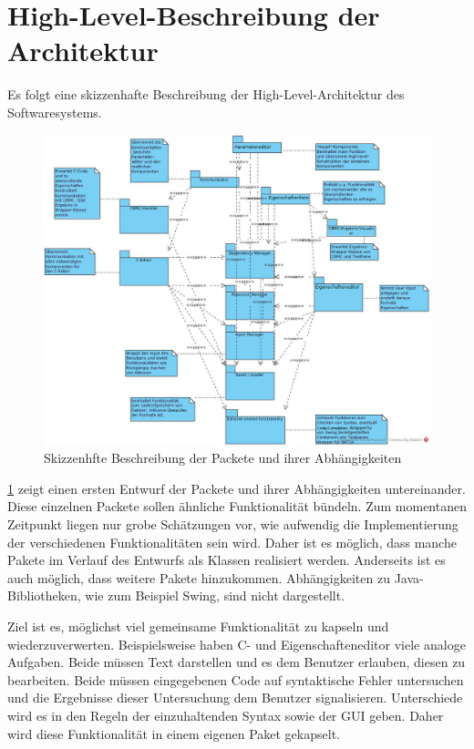 \documentclass[a4paper]{scrreprt}
\begin{document}
\section{High-Level-Beschreibung der Architektur}	
Es folgt eine skizzenhafte Beschreibung der High-Level-Architektur des Softwaresystems. 

\begin{figure}[H]
\includegraphics[scale=0.4]{architecture_first_scetch.png}
\caption{Skizzenhfte Beschreibung der Packete und ihrer Abhängigkeiten}
\label{Packet-scetch}
\end{figure}

\ref{Packet-scetch} zeigt einen ersten Entwurf der Packete und ihrer Abhängigkeiten untereinander. Diese einzelnen Packete sollen ähnliche Funktionalität bündeln. Zum momentanen Zeitpunkt liegen nur grobe Schätzungen vor, wie aufwendig die Implementierung der verschiedenen Funktionalitäten sein wird. Daher ist es möglich, dass manche Pakete im Verlauf des Entwurfs als Klassen realisiert werden. Anderseits ist es auch möglich, dass weitere Pakete hinzukommen. Abhängigkeiten zu Java-Bibliotheken, wie zum Beispiel Swing, sind nicht dargestellt.

Ziel ist es, möglichst  viel gemeinsame Funktionalität zu kapseln und wiederzuverwerten. Beispielsweise haben C- und Eigenschafteneditor viele analoge Aufgaben. Beide müssen Text darstellen und es dem Benutzer erlauben, diesen zu bearbeiten. Beide müssen eingegebenen Code auf syntaktische Fehler untersuchen und die Ergebnisse dieser Untersuchung dem Benutzer signalisieren. Unterschiede wird es in den Regeln der einzuhaltenden Syntax sowie der \ac{GUI} geben. Daher wird diese Funktionalität in einem eigenen Paket gekapselt. 
\end{document}
